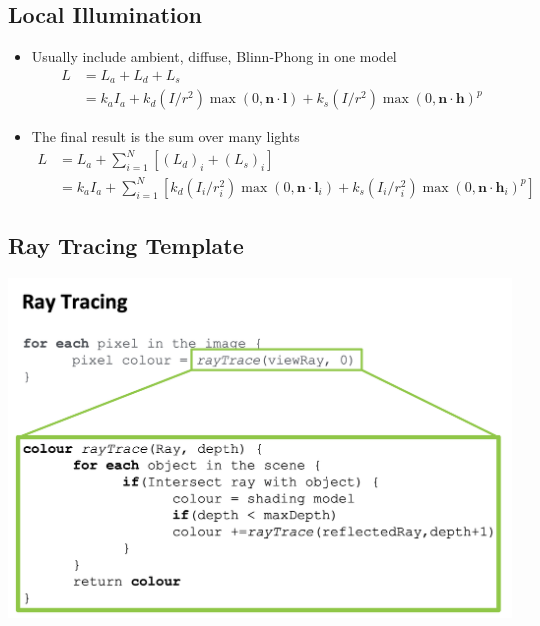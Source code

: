 \documentclass[11pt]{article}
\begin{document}
\subsection{Local Illumination}
\begin{itemize}
	\item Usually include ambient, diffuse, Blinn-Phong in one model
	\begin{equation}
		\begin{aligned}
			L &=L_{a}+L_{d}+L_{s} \\
			&=k_{a} I_{a}+k_{d}\left(I / r^{2}\right) \max (0, \mathbf{n} \cdot \mathbf{l})+k_{s}\left(I / r^{2}\right) \max (0, \mathbf{n} \cdot \mathbf{h})^{p}
		\end{aligned}
	\end{equation}
	\item The final result is the sum over many lights
	\begin{align}
		L
		&= L_{a}+\sum_{i=1}^{N}\left[\left(L_{d}\right)_{i}+\left(L_{s}\right)_{i}\right] \\
		&=k_{a} I_{a}+\sum_{i=1}^{N}\left[k_{d}\left(I_{i} / r_{i}^{2}\right) \max \left(0, \mathbf{n} \cdot \mathbf{l}_{i}\right)+
		k_{s}\left(I_{i} / r_{i}^{2}\right) \max \left(0, \mathbf{n} \cdot \mathbf{h}_{i}\right)^{p}\right]
	\end{align}
\end{itemize}

\subsection{Ray Tracing Template}
{\center \includegraphics[width=1.0\textwidth]{figs/ray trace}}
\end{document}
